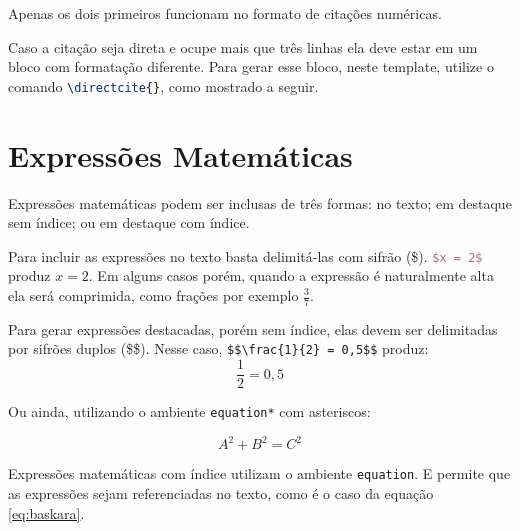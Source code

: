     Apenas os dois primeiros funcionam no formato de citações numéricas.

    Caso a citação seja direta e ocupe mais que três linhas ela deve estar em um bloco com formatação diferente.
    Para gerar esse bloco, neste template, utilize o comando \lstinline[language=TeX,style=code]|\directcite{}|, como mostrado a seguir.





\section{Expressões Matemáticas}
\label{sec:exmatematicas}

    Expressões matemáticas podem ser inclusas de três formas:
    no texto; em destaque sem índice; ou em destaque com índice.


    Para incluir as expressões no texto basta delimitá-las com sifrão (\$).
    \lstinline[language=TeX,style=code]|$x = 2$| produz $x = 2$.
    Em alguns casos porém, quando a expressão é naturalmente alta ela será comprimida, como frações por exemplo $\frac{3}{7}$.


    Para gerar expressões destacadas, porém sem índice, elas devem ser delimitadas por sifrões duplos (\$\$).
    Nesse caso, \lstinline[language=teX,style=code]|$$\frac{1}{2} = 0,5$$| produz:
    $$\frac{1}{2} = 0,5$$
    
    Ou ainda, utilizando o ambiente \lstinline[language=TeX,style=code]|equation*| com asteriscos:
    
    \begin{equation*}
        A^{2} + B^{2} = C^{2}
    \end{equation*}


    Expressões matemáticas com índice utilizam o ambiente \lstinline[language=TeX,style=code]|equation|.
    E permite que as expressões sejam referenciadas no texto, como é o caso da equação \ref{eq:baskara}.

